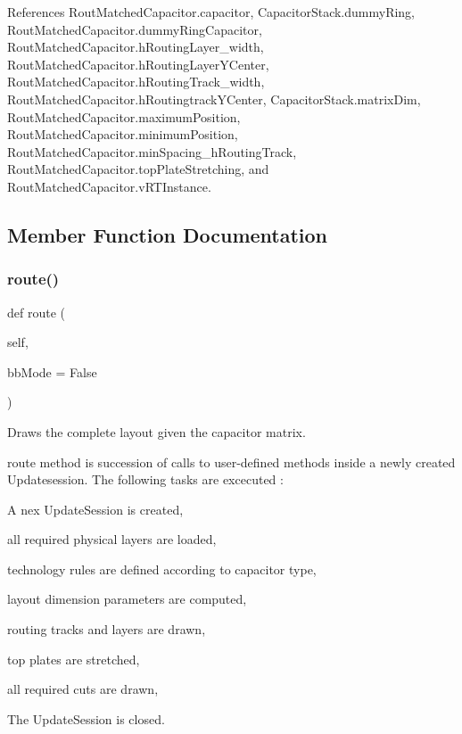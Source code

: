 References Rout\+Matched\+Capacitor.\+capacitor, Capacitor\+Stack.\+dummy\+Ring, Rout\+Matched\+Capacitor.\+dummy\+Ring\+Capacitor, Rout\+Matched\+Capacitor.\+h\+Routing\+Layer\+\_\+width, Rout\+Matched\+Capacitor.\+h\+Routing\+Layer\+Y\+Center, Rout\+Matched\+Capacitor.\+h\+Routing\+Track\+\_\+width, Rout\+Matched\+Capacitor.\+h\+Routingtrack\+Y\+Center, Capacitor\+Stack.\+matrix\+Dim, Rout\+Matched\+Capacitor.\+maximum\+Position, Rout\+Matched\+Capacitor.\+minimum\+Position, Rout\+Matched\+Capacitor.\+min\+Spacing\+\_\+h\+Routing\+Track, Rout\+Matched\+Capacitor.\+top\+Plate\+Stretching, and Rout\+Matched\+Capacitor.\+v\+R\+T\+Instance.



\subsection{Member Function Documentation}
\mbox{\label{classpython_1_1capacitorrouted_1_1RoutMatchedCapacitor_a84f0757a2a026ece5364ae0cc0872ef2}} 
\subsubsection{\texorpdfstring{route()}{route()}}
{\footnotesize\ttfamily def route (\begin{DoxyParamCaption}\item[{}]{self,  }\item[{}]{bb\+Mode = {\ttfamily False} }\end{DoxyParamCaption})}



Draws the complete layout given the capacitor matrix. 

{\ttfamily route} method is succession of calls to user-\/defined methods inside a newly created {\ttfamily Updatesession}. The following tasks are excecuted \+:
\begin{DoxyEnumerate}
\item A nex {\ttfamily Update\+Session} is created,
\item all required physical layers are loaded,
\item technology rules are defined according to capacitor type,
\item layout dimension parameters are computed,
\item routing tracks and layers are drawn,
\item top plates are stretched,
\item all required cuts are drawn,
\item The {\ttfamily Update\+Session} is closed.
\end{DoxyEnumerate}

